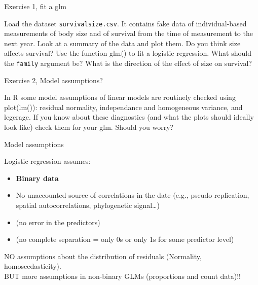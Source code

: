 \documentclass{beamer}\usepackage[]{graphicx}\usepackage[]{color}
\begin{document}
\begin{frame}{Exercise 1, fit a glm}

Load the dataset \texttt{survivalsize.csv}. It contains fake data of individual-based measurements of body size and of survival from the time of measurement to the next year. Look at a summary of the data and plot them. Do you think size affects survival?
Use the function glm() to fit a logistic regression. What should the \texttt{family} argument be? What is the direction of the effect of size on survival?

\end{frame}

\begin{frame}{Exercise 2, Model assumptions?}

In R some model assumptions of linear models are routinely checked using plot(lm()): residual normality, independance and homogeneous variance, and legerage. If you know about these diagnostics (and what the plots should ideally look like) check them for your glm. Should you worry?
\end{frame}

\begin{frame}{Model assumptions}
\begin{block}{Logistic regression assumes:}
\begin{itemize}[<+->]
  \item \textbf{Binary data}
  \item No unaccounted source of correlations in the date (e.g., pseudo-replication, spatial autocorrelations, phylogenetic signal\dots)
  \item (no error in the predictors)
  \item (no complete separation = only 0s or only 1s for some predictor level)
\end{itemize}
\end{block}

\pause

NO assumptions about the distribution of residuals (Normality, homoscedasticity).\\
BUT more assumptions in non-binary GLMs (proportions and count data)!!

\end{frame}
\end{document}
